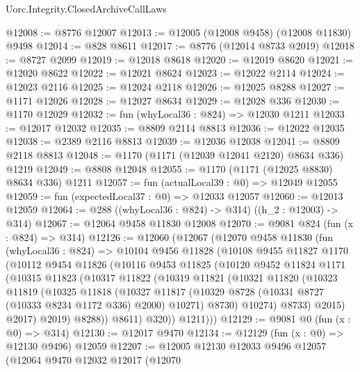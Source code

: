 \begin{lexlean}{Uorc.Integrity.ClosedArchiveCallLaws}
\begin{coremodule}
@12008 := @8776 @12007
@12013 := @12005 (@12008 @9458) (@12008 @11830) @9498
@12014 := @828 @8611
@12017 := @8776 (@12014 @8733 @2019)
@12018 := @8727 @2099
@12019 := @12018 @8618
@12020 := @12019 @8620
@12021 := @12020 @8622
@12022 := @12021 @8624
@12023 := @12022 @2114
@12024 := @12023 @2116
@12025 := @12024 @2118
@12026 := @12025 @8288
@12027 := @1171 @12026
@12028 := @12027 @8634
@12029 := @12028 @336
@12030 := @1170 @12029
@12032 := fun (whyLocal36 : @824) => @12030 @1211
@12033 := @12017 @12032
@12035 := @8809 @2114 @8813
@12036 := @12022 @12035
@12038 := @2389 @2116 @8813
@12039 := @12036 @12038
@12041 := @8809 @2118 @8813
@12048 := @1170 (@1171 (@12039 @12041 @2120) @8634 @336) @1219
@12049 := @8808 @12048
@12055 := @1170 (@1171 (@12025 @8830) @8634 @336) @1211
@12057 := fun (actualLocal39 : @0) => @12049 @12055
@12059 := fun (expectedLocal37 : @0) => @12033 @12057
@12060 := @12013 @12059
@12064 := @288 ((whyLocal36 : @824) -> @314) ((h_2 : @12003) -> @314)
@12067 := @12064 @9458 @11830 @12008
@12070 := @9081 @824 (fun (x : @824) => @314)
@12126 := @12060
    (@12067
      (@12070
        @9458
        @11830
        (fun (whyLocal36 : @824) =>
        @10104
          @9456
          @11828
          (@10108
            @9455
            @11827
            @1170
            (@10112
              @9454
              @11826
              (@10116
                @9453
                @11825
                (@10120
                  @9452
                  @11824
                  @1171
                  (@10315
                    @11823
                    (@10317
                      @11822
                      (@10319
                        @11821
                        (@10321
                          @11820
                          (@10323
                            @11819
                            (@10325
                              @11818
                              (@10327
                                @11817
                                (@10329 @8728 (@10331 @8727 (@10333 @8234 @1172 @336) @2000) @10271)
                                @8730)
                              @10274)
                            @8733)
                          @2015)
                        @2017)
                      @2019)
                    @8288))
                @8611)
              @320))
          @1211)))
@12129 := @9081 @0 (fun (x : @0) => @314)
@12130 := @12017 @9470
@12134 := @12129 (fun (x : @0) => @12130 @9496) @12059
@12207 := @12005
    @12130
    @12033
    @9496
    @12057
    (@12064
      @9470
      @12032
      @12017
      (@12070

\end{coremodule}
\end{lexlean}
